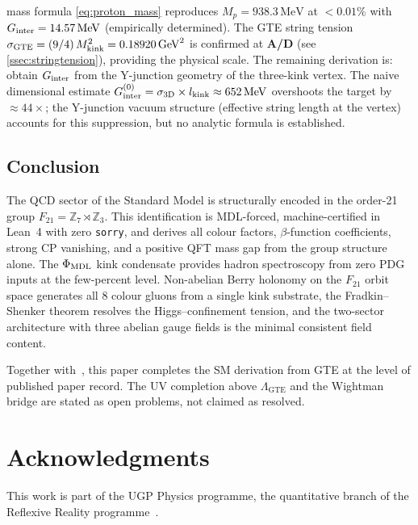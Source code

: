 \documentclass[11pt]{article}
\theoremstyle{remark}
\newcommand{\GTE}{\text{GTE}}
\newcommand{\ZS}{\mathbb{Z}_7}
\newcommand{\ZZ}{\mathbb{Z}}
\newcommand{\phimdl}{\Phi_{\rm MDL}}
\newcommand{\Ftwentyone}{F_{21}}
\newcommand{\CatAD}{\textbf{A/D}}
\begin{document}
\begin{itemize}[leftmargin=2em]
  mass formula \eqref{eq:proton_mass} reproduces $M_p = 938.3\,\mathrm{MeV}$ at
  $<0.01\%$ with $G_{\rm inter} = 14.57\,\mathrm{MeV}$ (empirically determined).
  The GTE string tension $\sigma_{\GTE} = (9/4)\,M_{\rm kink}^2 = 0.18920\,\mathrm{GeV}^2$
  is confirmed at \CatAD{} (see \cref{ssec:stringtension}), providing the
  physical scale.  The remaining derivation is: obtain $G_{\rm inter}$ from the
  Y-junction geometry of the three-kink vertex.  The naive dimensional estimate
  $G_{\rm inter}^{\rm(0)} = \sigma_{\rm 3D}\times l_{\rm kink} \approx 652\,\mathrm{MeV}$
  overshoots the target by $\approx 44\times$; the Y-junction vacuum structure
  (effective string length at the vertex) accounts for this suppression, but no
  analytic formula is established.
\end{itemize}

\subsection{Conclusion}
\label{ssec:conclusion}

The QCD sector of the Standard Model is structurally encoded in the order-21
group $\Ftwentyone = \ZS \rtimes \ZZ_3$.
This identification is MDL-forced, machine-certified in Lean~4 with zero
\texttt{sorry}, and derives all colour factors, $\beta$-function coefficients,
strong CP vanishing, and a positive QFT mass gap from the group structure
alone.
The $\phimdl$ kink condensate provides hadron spectroscopy from zero PDG inputs
at the few-percent level.
Non-abelian Berry holonomy on the $\Ftwentyone$ orbit space generates all 8
colour gluons from a single kink substrate, the Fradkin--Shenker theorem
resolves the Higgs--confinement tension, and the two-sector architecture with
three abelian gauge fields is the minimal consistent field content.

Together with~\cite{SpivackGTEUnification}, this paper completes the SM
derivation from GTE at the level of published paper record.
The UV completion above $\Lambda_{\GTE}$ and the Wightman bridge are stated as
open problems, not claimed as resolved.

\section*{Acknowledgments}

This work is part of the UGP Physics programme, the quantitative branch of the Reflexive Reality programme~\cite{SpivackResearchProgrammes}.
\end{document}
